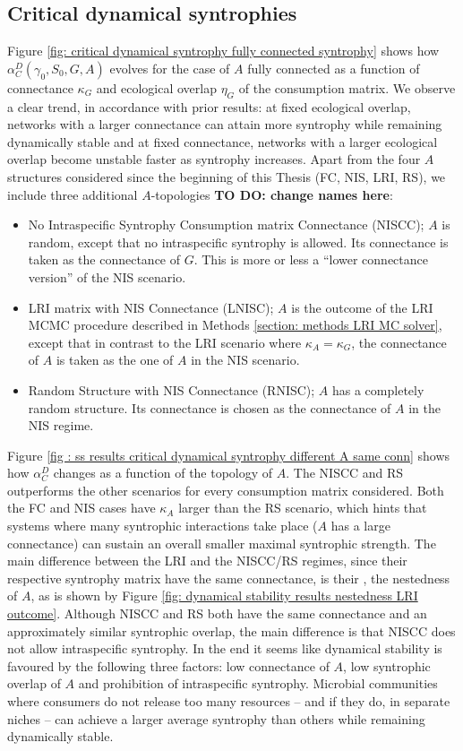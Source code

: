 \documentclass[12pt, titlepage]{report}
\begin{document}
\subsection{Critical dynamical syntrophies}\label{sec: results structural stability critical dynamical syntrophies}
Figure \ref{fig: critical dynamical syntrophy fully connected syntrophy} shows how $\alpha_C^D(\gamma_0, S_0, G, A)$ evolves for the case of $A$ fully connected as a function of connectance $\kappa_G$ and ecological overlap $\eta_G$ of the consumption matrix. We observe a clear trend, in accordance with prior results: at fixed ecological overlap, networks with a larger connectance can attain more syntrophy while remaining dynamically stable and at fixed connectance, networks with a larger ecological overlap become unstable faster as syntrophy increases. Apart from the four $A$ structures considered since the beginning of this Thesis (FC, NIS, LRI, RS), we include three additional $A$-topologies \textbf{TO DO: change names here}:
\begin{itemize}
\item No Intraspecific Syntrophy Consumption matrix Connectance (NISCC); $A$ is random, except that no intraspecific syntrophy is allowed. Its connectance is taken as the connectance of $G$. This is more or less a  ``lower connectance version'' of the NIS scenario.

\item LRI matrix with NIS Connectance (LNISC); $A$ is the outcome of the LRI MCMC procedure described in Methods \ref{section: methods LRI MC solver}, except that in contrast to the LRI scenario where $\kappa_A=\kappa_G$, the connectance of $A$ is taken as the one of $A$ in the NIS scenario.

\item Random Structure with NIS Connectance (RNISC); $A$ has a completely random structure. Its connectance is chosen as the connectance of $A$ in the NIS regime.
\end{itemize}
Figure \ref{fig : ss results critical dynamical syntrophy different A same conn} shows how $\alpha_C^D$ changes as a function of the topology of $A$. The NISCC and RS outperforms the other scenarios for every consumption matrix considered. Both the FC and NIS cases have $\kappa_A$ larger than the RS scenario, which hints that systems where many syntrophic interactions take place (\ie $A$ has a large connectance) can sustain an overall smaller maximal syntrophic strength. The main difference between the LRI and the NISCC/RS regimes, since their respective syntrophy matrix have the same connectance, is their , \ie the nestedness of $A$, as is shown by Figure \ref{fig: dynamical stability results nestedness LRI outcome}. Although NISCC and RS both have the same connectance and an approximately similar syntrophic overlap, the main difference is that NISCC does not allow intraspecific syntrophy. In the end it seems like dynamical stability is favoured by the following three factors: low connectance of $A$, low syntrophic overlap of $A$ and prohibition of intraspecific syntrophy. Microbial communities where consumers do not release too many resources -- and if they do, in separate niches -- can achieve a larger average syntrophy than others while remaining dynamically stable.
\end{document}
